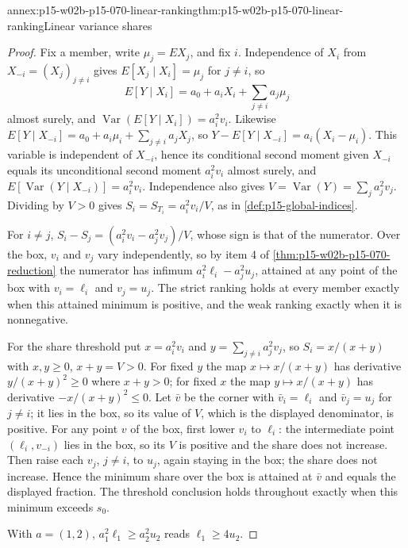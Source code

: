 \begin{annexitem}{annex:p15-w02b-p15-070-linear-ranking}{thm:p15-w02b-p15-070-linear-ranking}{Linear variance shares}
\begin{proof}
Fix a member, write \(\mu_j=EX_j\), and fix \(i\). Independence of
\(X_i\) from \(X_{-i}=(X_j)_{j\ne i}\) gives
\(E[X_j\mid X_i]=\mu_j\) for \(j\ne i\), so
\[
 E[Y\mid X_i]=a_0+a_iX_i+\sum_{j\ne i}a_j\mu_j
\]
almost surely, and \(\operatorname{Var}(E[Y\mid X_i])=a_i^2v_i\).
Likewise \(E[Y\mid X_{-i}]=a_0+a_i\mu_i+\sum_{j\ne i}a_jX_j\), so
\(Y-E[Y\mid X_{-i}]=a_i(X_i-\mu_i)\). This variable is independent of
\(X_{-i}\), hence its conditional second moment given \(X_{-i}\) equals
its unconditional second moment \(a_i^2v_i\) almost surely, and
\(E[\operatorname{Var}(Y\mid X_{-i})]=a_i^2v_i\).
Independence also gives \(V=\operatorname{Var}(Y)=\sum_ja_j^2v_j\).
Dividing by \(V>0\) gives \(S_i=S_{T_i}=a_i^2v_i/V\), as in
\cref{def:p15-global-indices}.

For \(i\ne j\), \(S_i-S_j=(a_i^2v_i-a_j^2v_j)/V\), whose sign is that
of the numerator. Over the box, \(v_i\) and \(v_j\) vary independently,
so by item 4 of \cref{thm:p15-w02b-p15-070-reduction} the numerator has
infimum \(a_i^2\ell_i-a_j^2u_j\), attained at any point of the box with
\(v_i=\ell_i\) and \(v_j=u_j\). The strict ranking holds at every member
exactly when this attained minimum is positive, and the weak ranking
exactly when it is nonnegative.

For the share threshold put \(x=a_i^2v_i\) and
\(y=\sum_{j\ne i}a_j^2v_j\), so \(S_i=x/(x+y)\) with \(x,y\geq0\),
\(x+y=V>0\). For fixed \(y\) the map \(x\mapsto x/(x+y)\) has derivative
\(y/(x+y)^2\geq0\) where \(x+y>0\); for fixed \(x\) the map
\(y\mapsto x/(x+y)\) has derivative \(-x/(x+y)^2\leq0\). Let \(\bar v\)
be the corner with \(\bar v_i=\ell_i\) and \(\bar v_j=u_j\) for
\(j\ne i\); it lies in the box, so its value of \(V\), which is the
displayed denominator, is positive. For any point \(v\) of the box,
first lower \(v_i\) to \(\ell_i\): the intermediate point
\((\ell_i,v_{-i})\) lies in the box, so its \(V\) is positive and the
share does not increase. Then raise each \(v_j\), \(j\ne i\), to
\(u_j\), again staying in the box; the share does not increase. Hence
the minimum share over the box is attained at \(\bar v\) and equals the
displayed fraction. The threshold conclusion holds throughout exactly
when this minimum exceeds \(s_0\).

With \(a=(1,2)\), \(a_1^2\ell_1\geq a_2^2u_2\) reads
\(\ell_1\geq4u_2\).
\end{proof}
\end{annexitem}

